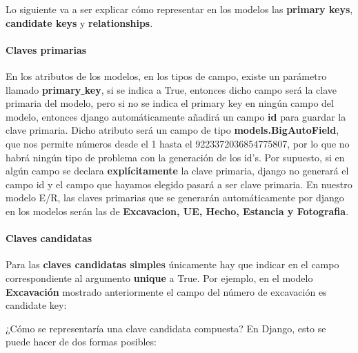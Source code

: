     Lo siguiente va a ser explicar cómo representar en los modelos las \textbf{primary keys},
    \textbf{candidate keys} y \textbf{relationships}.\\
    
    \paragraph{Claves primarias} \underline{}
    \newline En los atributos de los modelos, en los tipos de campo, existe un parámetro llamado
    \textbf{primary\underline{ }key}, si se indica a True, entonces dicho campo será la clave
    primaria del modelo, pero si no se indica el primary key en ningún campo del modelo,
    entonces django automáticamente añadirá un campo \textbf{id} para guardar la clave primaria.
    Dicho atributo será un campo de tipo \textbf{models.BigAutoField}, que nos permite números
    desde el 1 hasta el 9223372036854775807, por lo que no habrá ningún tipo de problema con
    la generación de los id's. Por supuesto, si en algún campo se declara \textbf{explícitamente}
    la clave primaria, django no generará el campo id y el campo que hayamos elegido pasará a
    ser clave primaria. En nuestro modelo E/R, las claves primarias que se generarán
    automáticamente por django en los modelos serán las de \textbf{Excavacion, UE, Hecho,
    Estancia y Fotografia}. 
    
    \paragraph{Claves candidatas} \underline{}
    \newline Para las \textbf{claves candidatas simples} únicamente hay que indicar en el campo
    correspondiente al argumento \textbf{unique} a True. Por ejemplo, en el modelo
    \textbf{Excavación} mostrado anteriormente el campo del número de excavación es
    candidate key:
    

    ¿Cómo se representaría una clave candidata compuesta? En Django, esto se puede hacer de
    dos formas posibles:

